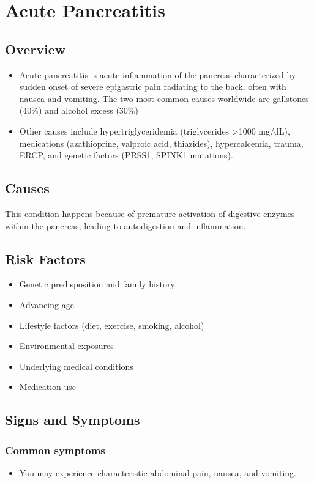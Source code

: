 \chapter{Acute Pancreatitis}
\label{sec:Acute Pancreatitis}

\section{Overview}


\begin{itemize}[noitemsep]
  \item Acute pancreatitis is acute inflammation of the pancreas characterized by sudden onset of severe epigastric pain radiating to the back, often with nausea and vomiting. The two most common causes worldwide are gallstones (40\%) and alcohol excess (30\%)
  \item Other causes include hypertriglyceridemia (triglycerides >1000 mg/dL), medications (azathioprine, valproic acid, thiazides), hypercalcemia, trauma, ERCP, and genetic factors (PRSS1, SPINK1 mutations).
\end{itemize}
\section{Causes}
This condition happens because of premature activation of digestive enzymes within the pancreas, leading to autodigestion and inflammation.     
\section{Risk Factors}

\begin{itemize}[noitemsep]
  \item Genetic predisposition and family history
  \item Advancing age
  \item Lifestyle factors (diet, exercise, smoking, alcohol)
  \item Environmental exposures
  \item Underlying medical conditions
  \item Medication use
\end{itemize}
\section{Signs and Symptoms}

\subsection{Common symptoms}
\begin{itemize}[noitemsep]
  \item You may experience characteristic abdominal pain, nausea, and vomiting. 
  \end{itemize}

